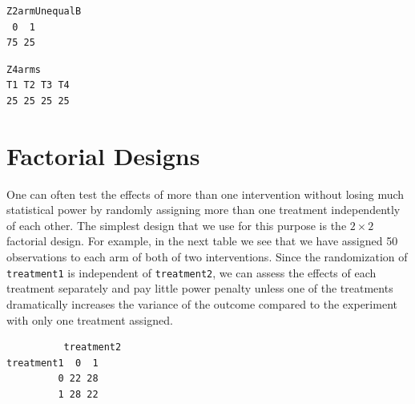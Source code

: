 \documentclass[
  12pt,
]{book}
\newenvironment{Shaded}{\begin{snugshade}}{\end{snugshade}}
\newcommand{\CommentTok}[1]{\textcolor[rgb]{0.56,0.35,0.01}{\textit{#1}}}
\newcommand{\DataTypeTok}[1]{\textcolor[rgb]{0.13,0.29,0.53}{#1}}
\newcommand{\KeywordTok}[1]{\textcolor[rgb]{0.13,0.29,0.53}{\textbf{#1}}}
\newcommand{\NormalTok}[1]{#1}
\newcommand{\OperatorTok}[1]{\textcolor[rgb]{0.81,0.36,0.00}{\textbf{#1}}}
\newcommand{\StringTok}[1]{\textcolor[rgb]{0.31,0.60,0.02}{#1}}
\theoremstyle{definition}
\theoremstyle{definition}
\theoremstyle{definition}
\theoremstyle{remark}
\begin{document}
\begin{verbatim}
Z2armUnequalB
 0  1 
75 25 
\end{verbatim}

\begin{Shaded}
\end{Shaded}

\begin{verbatim}
Z4arms
T1 T2 T3 T4 
25 25 25 25 
\end{verbatim}

\hypertarget{factorial-designs}{%
\section{Factorial Designs}\label{factorial-designs}}

One can often test the effects of more than one intervention without
losing much statistical power by randomly assigning more than one
treatment independently of each other. The simplest design that we use
for this purpose is the \(2 \times 2\) factorial design. For example, in
the next table we see that we have assigned 50 observations to each arm
of both of two interventions. Since the randomization of
\texttt{treatment1} is independent of \texttt{treatment2}, we can assess
the effects of each treatment separately and pay little power penalty
unless one of the treatments dramatically increases the variance of the
outcome compared to the experiment with only one treatment assigned.

\begin{Shaded}
\end{Shaded}

\begin{verbatim}
          treatment2
treatment1  0  1
         0 22 28
         1 28 22
\end{verbatim}
\end{document}
